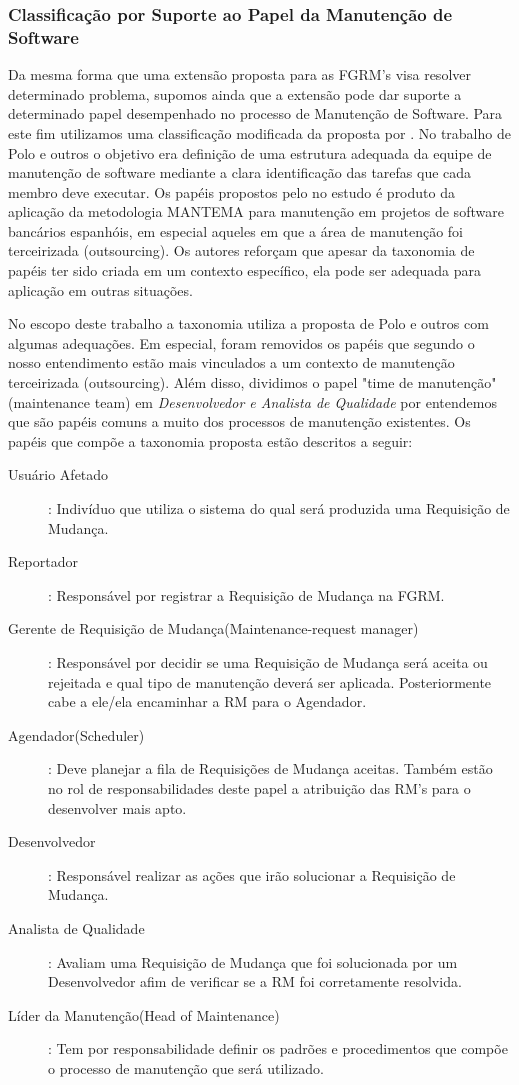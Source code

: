 \subsubsection{Classificação por Suporte ao Papel da Manutenção de Software}
\label{subsubsec:map-esquema-suporte-papel-man}

Da mesma forma que uma extensão proposta para as FGRM's visa resolver determinado
problema, supomos ainda que a extensão pode dar suporte a determinado papel desempenhado no processo
de Manutenção de Software. Para este fim utilizamos uma classificação modificada da proposta
por \cite{Polo1999}. No trabalho de Polo e outros o objetivo era definição de uma estrutura adequada
da equipe de manutenção de software mediante a clara identificação das tarefas que cada membro deve
executar. Os papéis propostos pelo no estudo é produto da aplicação da metodologia MANTEMA\cite{756695} para
manutenção em projetos de software bancários espanhóis, em especial aqueles em que a área de
manutenção foi terceirizada (outsourcing). Os autores reforçam que apesar da taxonomia de papéis ter
sido criada em um contexto específico, ela pode ser adequada para aplicação em outras situações.

No escopo deste trabalho a taxonomia utiliza a proposta de Polo e outros com algumas adequações. Em
especial, foram removidos os papéis que segundo o nosso entendimento estão mais vinculados a um
contexto de manutenção terceirizada (outsourcing). Além disso, dividimos o papel "time de manutenção"
(maintenance team) em \textit{Desenvolvedor e Analista de Qualidade} por entendemos que são papéis
comuns a muito dos processos de manutenção existentes. Os papéis que compõe a taxonomia proposta
estão descritos a seguir:

\begin{description}
	\item[Usuário Afetado]: Indivíduo que utiliza o sistema do qual será produzida uma Requisição de
		Mudança.
	\item[Reportador]: Responsável por registrar a Requisição de Mudança na FGRM.
	\item[Gerente de Requisição de Mudança(Maintenance-request manager)]: Responsável por decidir se
		uma Requisição de Mudança será aceita ou rejeitada e qual tipo de manutenção deverá ser
		aplicada. Posteriormente cabe a ele/ela encaminhar a RM para o Agendador.
	\item[Agendador(Scheduler)]: Deve planejar a fila de Requisições de Mudança aceitas. Também
		estão no rol de responsabilidades deste papel a atribuição das RM's para o desenvolver
		mais apto.
	\item[Desenvolvedor]: Responsável realizar as ações que irão solucionar a Requisição de Mudança.
	\item[Analista de Qualidade]: Avaliam uma Requisição de Mudança que foi solucionada por um
		Desenvolvedor afim de verificar se a RM foi corretamente resolvida.
	\item[Líder da Manutenção(Head of Maintenance)]: Tem por responsabilidade definir os padrões
		e procedimentos que compõe o processo de manutenção que será utilizado.
\end{description}


